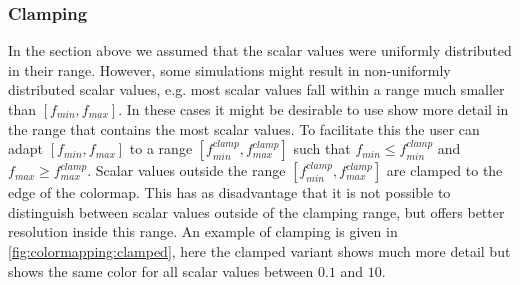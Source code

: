 \subsubsection{Clamping} %
\label{ssub:clamping}
In the section above we assumed that the scalar values were uniformly distributed in their range. However, some simulations might result in non-uniformly distributed scalar values, e.g. most scalar values fall within a range much smaller than $[f_{min}, f_{max}]$. In these cases it might be desirable to use show more detail in the range that contains the most scalar values. To facilitate this the user can adapt $[f_{min}, f_{max}]$ to a range $[f^{clamp}_{min}, f^{clamp}_{max}]$ such that $f_{min} \leq f^{clamp}_{min}$ and $f_{max} \geq f^{clamp}_{max}$. Scalar values outside the range $[f^{clamp}_{min}, f^{clamp}_{max}]$ are clamped to the edge of the colormap. This has as disadvantage that it is not possible to distinguish between scalar values outside of the clamping range, but offers better resolution inside this range. An example of clamping is given in \cref{fig:colormapping:clamped}, here the clamped variant shows much more detail but shows the same color for all scalar values between $0.1$ and $10$.

